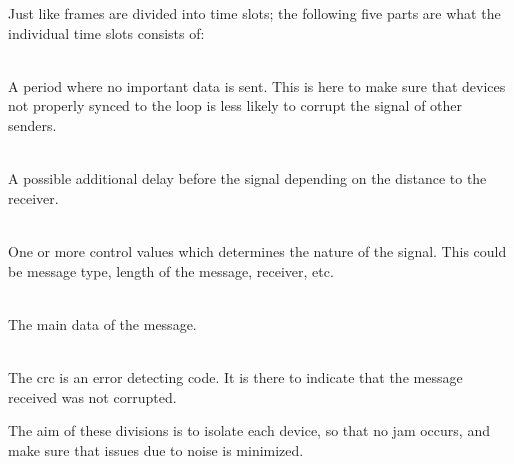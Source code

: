 \noindent
Just like frames are divided into time slots; the following five parts are what the individual time slots consists of:

\begin{description}[labelindent=\parindent]
	\item[Guard time]\hfill\\ 
	A period where no important data is sent.
	This is here to make sure that devices not properly synced to the loop is less likely to corrupt the signal of other senders.

	\item[Sync]\hfill\\ 
	A possible additional delay before the signal depending on the distance to the receiver.

	\item[Control]\hfill\\
	One or more control values which determines the nature of the signal. 
	This could be message type, length of the message, receiver, etc.

	\item[Data]\hfill\\
	The main data of the message.

	\item[\acrshort{crc} check]\hfill\\
	The \gls{crc} is an error detecting code. 
	It is there to indicate that the message received was not corrupted. 
\end{description}

\bigskip
\noindent
The aim of these divisions is to isolate each device, so that no jam occurs, and make sure that issues due to noise is minimized. 